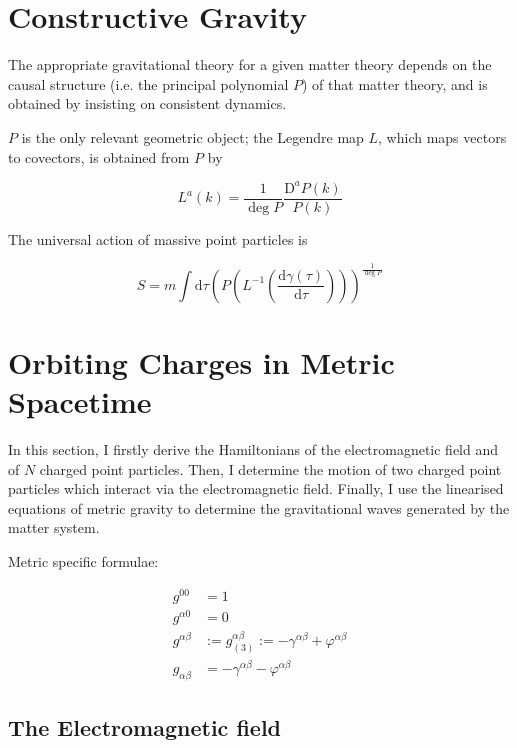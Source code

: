 \documentclass[11pt]{article}
\begin{document}
\section{Constructive Gravity}

The appropriate gravitational theory for a given matter theory depends on the causal structure (i.e. the principal polynomial $P$) of that matter theory, and is obtained by insisting on consistent dynamics. 

$P$ is the only relevant geometric object; the Legendre map $L$, which maps vectors to covectors, is obtained from $P$ by

\begin{equation}
	L^a \left( k \right) = \frac{1}{\deg{P}}\frac{\mathrm{D}^a P \left( k \right)}{P\left(k\right)}
\end{equation}

The universal action of massive point particles is

\begin{equation}
	S = m \int \mathrm{d}\tau \left(P \left( L^{-1} \left( \frac{\mathrm{d} \gamma\left(\tau \right)}{\mathrm{d}\tau} \right) \right)\right)^{\frac{1}{\deg{P}}}
\end{equation}

\section{Orbiting Charges in Metric Spacetime}

In this section, I firstly derive the Hamiltonians of the electromagnetic field and of $N$ charged point particles. Then, I determine the motion of two charged point particles which interact via the electromagnetic field. Finally, I use the linearised equations of metric gravity to determine the gravitational waves generated by the matter system. 

Metric specific formulae:

\begin{align}
	g^{00} &= 1 \\
	g^{\alpha 0} &= 0 \\
	g^{\alpha \beta} &:= g_{(3)}^{\alpha \beta}  := - \gamma^{\alpha \beta} + \varphi^{\alpha \beta}\\
	g_{\alpha \beta} &= - \gamma^{\alpha \beta} - \varphi^{\alpha \beta}
\end{align}

\subsection{The Electromagnetic field}
\end{document}
